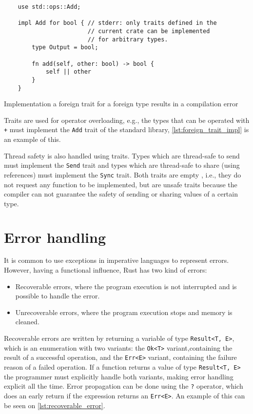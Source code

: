 \begin{listing}[ht]
	\begin{verbatim}
    use std::ops::Add;

    impl Add for bool { // stderr: only traits defined in the
                        // current crate can be implemented 
                        // for arbitrary types.
        type Output = bool;
        
        fn add(self, other: bool) -> bool {
            self || other
        }
    }
    \end{verbatim}
  \caption{Implementation a foreign trait for a foreign type results in a compilation error}
  \label{lst:foreign_trait_foreign_impl}
\end{listing}

Traits are used for operator overloading, e.g., the types that can be operated with \texttt{+} must implement the \texttt{Add} trait of the standard library, \ref{lst:foreign_trait_impl} is an example of this. 

Thread safety is also handled using traits. Types which are thread-safe to send must implement the \texttt{Send} trait and types which are thread-safe to share (using references) must implement the \texttt{Sync} trait. Both traits are empty , i.e., they do not request any function to be implemented, but are unsafe traits because the compiler can not guarantee the safety of sending or sharing values of a certain type.

\section{Error handling}
It is common to use exceptions in imperative languages to represent errors. However, having a functional influence, Rust has two kind of errors: 
\begin{itemize}
    \item Recoverable errors, where the program execution is not interrupted and is possible to handle the error.
    \item Unrecoverable errors, where the program execution stops and memory is cleaned.
\end{itemize}

Recoverable errors are written by returning a variable of type \texttt{Result<T, E>}, which is an enumeration with two variants: the \texttt{Ok<T>} variant,containing the result of a successful operation, and the \texttt{Err<E>} variant, containing the failure reason of a failed operation. If a function returns a value of type \texttt{Result<T, E>} the programmer must explicitly handle both variants, making error handling explicit all the time. Error propagation can be done using the \texttt{?} operator, which does an early return if the expression returns an \texttt{Err<E>}. An example of this can be seen on \ref{lst:recoverable_error}.

